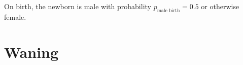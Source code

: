 \documentclass[12pt]{article}
\newcommand{\md}{\mathrm{d}}
\begin{document}



On birth, the newborn is male with probability
$p_{\text{male birth}} = 0.5$ or otherwise female.


\section{Waning}
\end{document}
